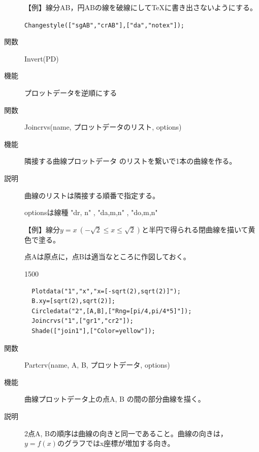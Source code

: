 \documentclass[papersize,a4paper,12pt,uplatex]{jsarticle}
\begin{document}
\begin{description}
\vspace{\baselineskip}
【例】線分AB，円ABの線を破線にして\TeX に書き出さないようにする。

\hspace{10mm} \verb|Changestyle(["sgAB","crAB"],["da","notex"]);|
    

\vspace{\baselineskip}
\hypertarget{invert}{}
\item[関数]  Invert(PD)
\item[機能]  プロットデータを逆順にする

\vspace{\baselineskip}
\hypertarget{joincrvs}{}
\item[関数]  Joincrvs(name, プロットデータのリスト, options) 
\item[機能]  隣接する曲線プロットデータ のリストを繋いで1本の曲線を作る。
\item[説明]  曲線のリストは隣接する順番で指定する。

optionsは線種      "dr, n"  , "da,m,n" , "do,m,n"

\vspace{\baselineskip}
【例】線分$y=x\ (-\sqrt{2} \leq x \leq \sqrt{2})$と半円で得られる閉曲線を描いて黄色で塗る。

点Aは原点に，点Bは適当なところに作図しておく。

\begin{layer}{150}{0}
\end{layer}

\begin{verbatim}
  Plotdata("1","x","x=[-sqrt(2),sqrt(2)]");
  B.xy=[sqrt(2),sqrt(2)];
  Circledata("2",[A,B],["Rng=[pi/4,pi/4*5]"]);
  Joincrvs("1",["gr1","cr2"]);
  Shade(["join1"],["Color=yellow"]);
\end{verbatim}
\vspace{5mm}

\vspace{\baselineskip}
\hypertarget{partcrv}{}
\item[関数]  Partcrv(name, A, B, プロットデータ, options) 
\item[機能]  曲線プロットデータ上の点A, B の間の部分曲線を描く。
\item[説明]    2点A, Bの順序は曲線の向きと同一であること。曲線の向きは，$y=f(x)$のグラフではx座標が増加する向き。


\end{description}
\end{document}
